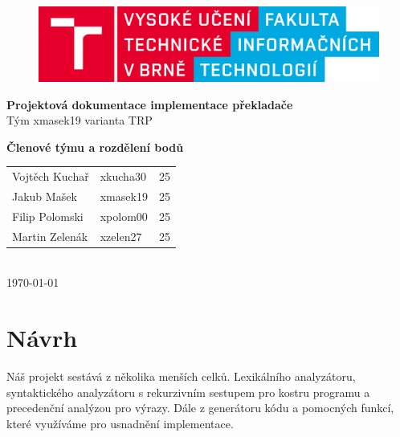 \documentclass{article}
\begin{document}
\thispagestyle{empty}
	
	\begin{figure}[ht]
		\includegraphics[height = 3 cm]{images/fit_logo.png}
		\label{FIT}
		\endminipage
	\end{figure}
	
	\begin{center}
	\vspace{1.cm}
	\LARGE
	\textbf{Projektová dokumentace implementace překladače}\\
	Tým xmasek19 varianta TRP\\
	\vspace{.3cm}
	\large
	
	\vspace{7.cm}
	\textbf{Členové týmu a rozdělení bodů}\\
            \begin{tabular}{l l l}
            Vojtěch Kuchař & xkucha30 & 25\\
            Jakub Mašek & xmasek19 & 25\\
            Filip Polomski & xpolom00 & 25\\
            Martin Zelenák & xzelen27 & 25\\
            \end{tabular}\\
	\vspace{1.3cm}
	\today
	\end{center}
	\newpage
	









\tableofcontents
\newpage




\section{Návrh}

Náš projekt sestává z několika menších celků. Lexikálního analyzátoru, syntaktického analyzátoru s rekurzivním sestupem pro kostru programu a precedenční analýzou pro výrazy. Dále z generátoru kódu a pomocných funkcí, které využíváme pro usnadnění implementace.
\end{document}
